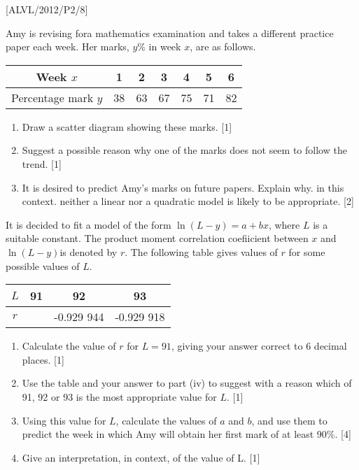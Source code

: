 \item {[}ALVL/2012/P2/8{]}

Amy is revising fora mathematics examination and takes a different
practice paper each week. Her marks, $y\%$ in week $x$, are as follows.
\noindent \begin{center}
\begin{tabular}{|c|c|c|c|c|c|c|}
\hline 
Week $x$ & 1 & 2 & 3 & 4 & 5 & 6\tabularnewline
\hline 
Percentage mark $y$ & 38 & 63 & 67 & 75 & 71 & 82\tabularnewline
\hline 
\end{tabular}
\par\end{center}
\begin{enumerate}
\item Draw a scatter diagram showing these marks. {[}1{]}
\item Suggest a possible reason why one of the marks does not seem to follow
the trend. {[}1{]}
\item It is desired to predict Amy's marks on future papers. Explain why.
in this context. neither a linear nor a quadratic model is likely
to be appropriate. {[}2{]} 
\end{enumerate}
It is decided to fit a model of the form $\ln\left(L-y\right)=a+bx$,
where $L$ is a suitable constant. The product moment correlation
coefiicient between $x$ and $\ln\left(L-y\right)$is denoted by $r$.
The following table gives values of $r$ for some possible values
of $L$.
\noindent \begin{center}
\begin{tabular}{|c|c|c|c|}
\hline 
$L$ & 91 & 92 & 93\tabularnewline
\hline 
$r$ &  & -0.929 944 & -0.929 918\tabularnewline
\hline 
\end{tabular}
\par\end{center}
\begin{enumerate}
\item Calculate the value of $r$ for $L=91$, giving your answer correct
to 6 decimal places. {[}1{]}
\item Use the table and your answer to part (iv) to suggest with a reason
which of 91, 92 or 93 is the most appropriate value for $L$. {[}1{]}
\item Using this value for $L$, calculate the values of $a$ and $b$,
and use them to predict the week in which Amy will obtain her first
mark of at least 90\%. {[}4{]}
\item Give an interpretation, in context, of the value of L. {[}1{]}
\end{enumerate}
